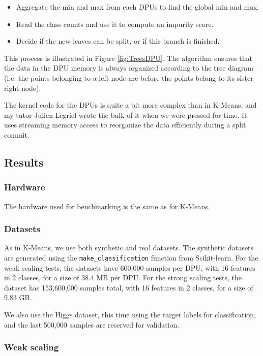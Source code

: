 \begin{itemize}
    \item Aggregate the min and max from each DPUs to find the global min and max.
    \item Read the class counts and use it to compute an impurity score.
    \item Decide if the new leaves can be split, or if this branch is finished.
\end{itemize}

This process is illustrated in Figure \ref{fig:TreesDPU}. The algorithm ensures that the data in the DPU memory is always organized according to the tree diagram (i.e. the points belonging to a left node are before the points belong to its sister right node).

The kernel code for the DPUs is quite a bit more complex than in K-Means, and my tutor Julien Legriel wrote the bulk of it when we were pressed for time. It uses streaming memory access to reorganize the data efficiently during a split commit.

\subsection{Results}

\subsubsection{Hardware}

The hardware used for benchmarking is the same as for K-Means.

\subsubsection{Datasets}

As in K-Means, we use both synthetic and real datasets. The synthetic datasets are generated using the \verb|make_classification| function from Scikit-learn. For the weak scaling tests, the datasets have 600,000 samples per DPU, with 16 features in 2 classes, for a size of 38.4 MB per DPU. For the strong scaling tests, the dataset has 153,600,000 samples total, with 16 features in 2 classes, for a size of 9.83 GB.

We also use the Higgs dataset, this time using the target labels for classification, and the last 500,000 samples are reserved for validation.

\subsubsection{Weak scaling}

